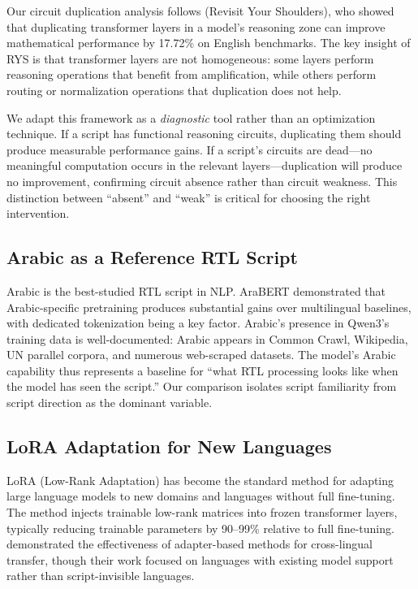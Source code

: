 \documentclass[11pt]{article}
\begin{document}
Our circuit duplication analysis follows \citet{ng2024rys} (Revisit Your Shoulders), who showed that duplicating transformer layers in a model's reasoning zone can improve mathematical performance by 17.72\% on English benchmarks.
The key insight of RYS is that transformer layers are not homogeneous: some layers perform reasoning operations that benefit from amplification, while others perform routing or normalization operations that duplication does not help.

We adapt this framework as a \emph{diagnostic} tool rather than an optimization technique.
If a script has functional reasoning circuits, duplicating them should produce measurable performance gains.
If a script's circuits are dead---no meaningful computation occurs in the relevant layers---duplication will produce no improvement, confirming circuit absence rather than circuit weakness.
This distinction between ``absent'' and ``weak'' is critical for choosing the right intervention.

\subsection{Arabic as a Reference RTL Script}

Arabic is the best-studied RTL script in NLP.
AraBERT \cite{antoun2020arabert} demonstrated that Arabic-specific pretraining produces substantial gains over multilingual baselines, with dedicated tokenization being a key factor.
Arabic's presence in Qwen3's training data is well-documented: Arabic appears in Common Crawl, Wikipedia, UN parallel corpora, and numerous web-scraped datasets.
The model's Arabic capability thus represents a baseline for ``what RTL processing looks like when the model has seen the script.''
Our comparison isolates script familiarity from script direction as the dominant variable.

\subsection{LoRA Adaptation for New Languages}

LoRA (Low-Rank Adaptation) \cite{hu2022lora} has become the standard method for adapting large language models to new domains and languages without full fine-tuning.
The method injects trainable low-rank matrices into frozen transformer layers, typically reducing trainable parameters by 90--99\% relative to full fine-tuning.
\citet{pfeiffer2020adapterhub} demonstrated the effectiveness of adapter-based methods for cross-lingual transfer, though their work focused on languages with existing model support rather than script-invisible languages.
\end{document}
